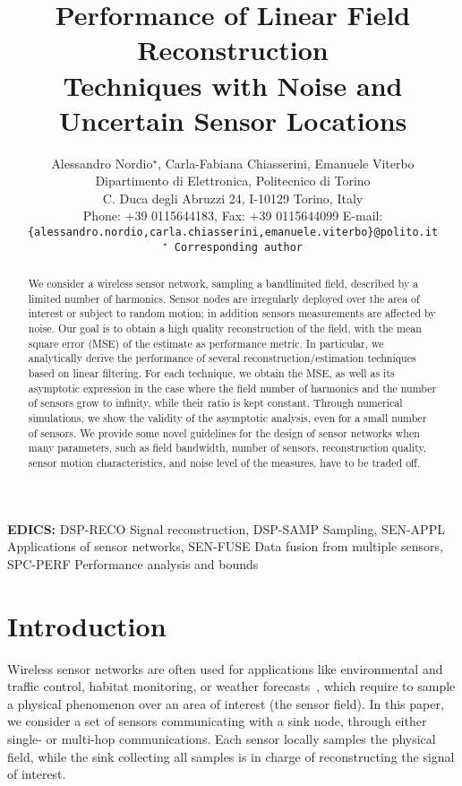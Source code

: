 \documentclass[final, a4paper]{IEEEtran}
\title{Performance of Linear Field Reconstruction\\ Techniques
with Noise and Uncertain Sensor Locations
}
\author{Alessandro Nordio$^\star$, Carla-Fabiana Chiasserini, Emanuele Viterbo\\
Dipartimento di Elettronica, Politecnico di Torino\\
C. Duca degli Abruzzi 24, I-10129 Torino, Italy\\
Phone: +39 0115644183, Fax: +39 0115644099
E-mail: \tt{\{alessandro.nordio,carla.chiasserini,emanuele.viterbo\}@polito.it} \\
{\rm $^\star$ Corresponding author}}
\begin{document}
\maketitle

\begin{abstract}
We consider a wireless sensor network, sampling a 
bandlimited field, described by a limited number of harmonics.
Sensor nodes are irregularly deployed over the area of
interest or subject to random motion; in addition sensors
measurements are affected by noise. Our goal is to obtain a high
quality reconstruction of the field, with the mean square error
(MSE) of the estimate as performance metric. In particular, we
analytically derive the performance of several
reconstruction/estimation techniques based on linear filtering. For
each technique, we obtain the MSE, as well as its
asymptotic expression in the case where the field
number of harmonics and the number of sensors grow
to infinity, while their ratio is kept constant.
Through numerical simulations, we show the validity of the
asymptotic analysis, even for a small number of sensors.
We provide some novel guidelines for the design of sensor networks when many parameters,
such as field bandwidth, number of sensors, reconstruction quality,
sensor motion characteristics, and noise level of the measures, have
to be traded off.
\end{abstract}

{\bf EDICS:}  DSP-RECO Signal reconstruction, DSP-SAMP Sampling,
SEN-APPL Applications of sensor networks,
SEN-FUSE Data fusion from multiple sensors,
SPC-PERF Performance analysis and bounds

\newpage
\section{Introduction}
Wireless sensor networks are often used for applications like environmental and traffic control,
habitat monitoring, or weather forecasts~\cite{Akyildiz02}, which
require to sample a physical phenomenon over an area of interest
(the sensor field).
In this paper, we consider a set of
sensors communicating with a sink node,
through either single- or multi-hop communications.
Each sensor locally samples the physical field, while the sink collecting all samples
is in charge of reconstructing the signal of interest.
\end{document}
